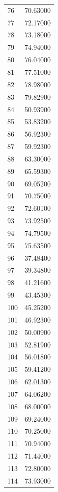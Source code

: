 \documentclass[
  letterpaper,
  DIV=11,
  numbers=noendperiod]{scrreprt}
\begin{document}
\begin{tcolorbox}
\begin{tabular}{lr}
76   &         70.63000 \\
77   &         72.17000 \\
78   &         73.18000 \\
79   &         74.94000 \\
80   &         76.04000 \\
81   &         77.51000 \\
82   &         78.98000 \\
83   &         79.82900 \\
84   &         50.93900 \\
85   &         53.83200 \\
86   &         56.92300 \\
87   &         59.92300 \\
88   &         63.30000 \\
89   &         65.59300 \\
90   &         69.05200 \\
91   &         70.75000 \\
92   &         72.60100 \\
93   &         73.92500 \\
94   &         74.79500 \\
95   &         75.63500 \\
96   &         37.48400 \\
97   &         39.34800 \\
98   &         41.21600 \\
99   &         43.45300 \\
100  &         45.25200 \\
101  &         46.92300 \\
102  &         50.00900 \\
103  &         52.81900 \\
104  &         56.01800 \\
105  &         59.41200 \\
106  &         62.01300 \\
107  &         64.06200 \\
108  &         68.00000 \\
109  &         69.24000 \\
110  &         70.25000 \\
111  &         70.94000 \\
112  &         71.44000 \\
113  &         72.80000 \\
114  &         73.93000 \\

\end{tabular}
\end{tcolorbox}
\end{document}
